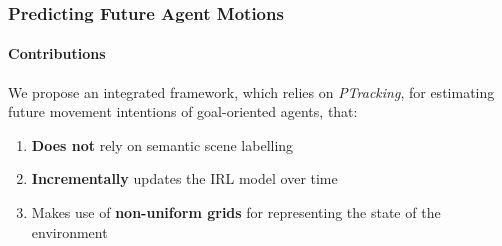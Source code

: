 \begin{frame}
	\frametitle{Predicting Future Agent Motions}
	\framesubtitle{Contributions}
	
	\Large
	
	\vspace{0.4cm}
	
	We propose an integrated framework, which relies on \emph{PTracking}, for estimating future movement
	intentions of goal-oriented agents, that:
	
	\vspace{0.15cm}
	
	\begin{enumerate}
		\item \textbf{Does not} rely on semantic scene labelling
		\item \textbf{Incrementally} updates the IRL model over time
		\item Makes use of \textbf{non-uniform grids} for representing the state of the environment
	\end{enumerate}
\end{frame}

